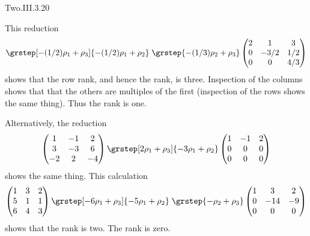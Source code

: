 \begin{ans}{Two.III.3.20}
      \begin{exparts}
         \partsitem This reduction
           \begin{equation*}
             \mbox{}
             \grstep[-(1/2)\rho_1+\rho_3]{-(1/2)\rho_1+\rho_2}
             \;\grstep{-(1/3)\rho_2+\rho_3}
             \begin{pmatrix}
               2  &1     &3     \\
               0  &-3/2  &1/2   \\
               0  &0     &4/3
             \end{pmatrix}
           \end{equation*}
           shows that the row rank, and hence the rank, is three.
         \partsitem Inspection of the columns shows that that the others
           are multiples of the first (inspection of the rows shows the same
           thing).
           Thus the rank is one.

           Alternatively, the reduction
           \begin{equation*}
             \begin{pmatrix}
               1  &-1  &2  \\
               3  &-3  &6  \\
               -2 &2   &-4
             \end{pmatrix}
             \grstep[2\rho_1+\rho_3]{-3\rho_1+\rho_2}
             \begin{pmatrix}
               1  &-1  &2  \\
               0  &0   &0  \\
               0  &0   &0
             \end{pmatrix}
           \end{equation*}
           shows the same thing.
         \partsitem This calculation
           \begin{equation*}
             \begin{pmatrix}
               1  &3  &2  \\
               5  &1  &1  \\
               6  &4  &3
             \end{pmatrix}
             \grstep[-6\rho_1+\rho_3]{-5\rho_1+\rho_2}
             \;\grstep{-\rho_2+\rho_3}
             \begin{pmatrix}
               1  &3   &2  \\
               0  &-14 &-9 \\
               0  &0   &0
             \end{pmatrix}
           \end{equation*}
           shows that the rank is two.
         \partsitem The rank is zero.
       \end{exparts}
     
\end{ans}

